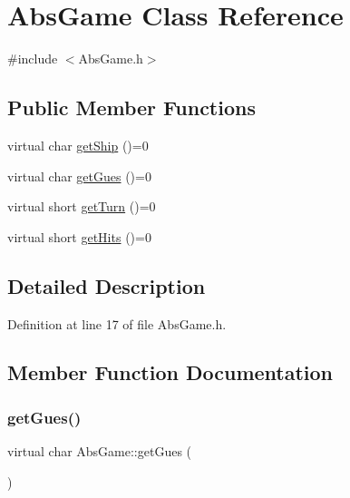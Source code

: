\hypertarget{class_abs_game}{}\section{Abs\+Game Class Reference}
\label{class_abs_game}


{\ttfamily \#include $<$Abs\+Game.\+h$>$}

\subsection*{Public Member Functions}
\begin{DoxyCompactItemize}
\item 
virtual char \hyperlink{class_abs_game_a075ff877d69ce6f7cbd4566cbd6fc3f8}{get\+Ship} ()=0
\item 
virtual char \hyperlink{class_abs_game_a740443eaf2d00365e42033fdfff43f8d}{get\+Gues} ()=0
\item 
virtual short \hyperlink{class_abs_game_a5d8cca6f9d9ef2d19f6dbd632289188d}{get\+Turn} ()=0
\item 
virtual short \hyperlink{class_abs_game_a038b7078fe6c66a372f1727fb4de0c6d}{get\+Hits} ()=0
\end{DoxyCompactItemize}


\subsection{Detailed Description}


Definition at line 17 of file Abs\+Game.\+h.



\subsection{Member Function Documentation}
\mbox{\label{class_abs_game_a740443eaf2d00365e42033fdfff43f8d}} 
\subsubsection{\texorpdfstring{get\+Gues()}{getGues()}}
{\footnotesize\ttfamily virtual char Abs\+Game\+::get\+Gues (\begin{DoxyParamCaption}{ }\end{DoxyParamCaption})\hspace{0.3cm}{\ttfamily [pure virtual]}}

